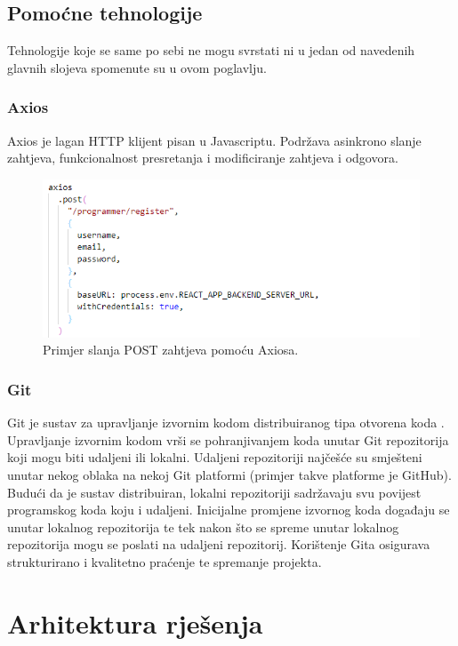 \documentclass[times, utf8, zavrsni]{fer}
\begin{document}
			\section{Pomoćne tehnologije}
			Tehnologije koje se same po sebi ne mogu svrstati ni u jedan od navedenih glavnih slojeva spomenute su u ovom poglavlju.
			\subsection{Axios}
			Axios je lagan HTTP klijent pisan u Javascriptu. Podržava asinkrono slanje zahtjeva, funkcionalnost presretanja i modificiranje zahtjeva i odgovora. 
			\begin{figure}[H]
				\centering
				\includegraphics[width=\linewidth]{pictures/prikazi/Axios.png}
				\caption{Primjer slanja POST zahtjeva pomoću Axiosa.}
				\label{fig:axios}
			\end{figure}
			\subsection{Git}
			Git je sustav za upravljanje izvornim kodom distribuiranog tipa otvorena koda . Upravljanje izvornim kodom vrši se pohranjivanjem koda unutar Git repozitorija koji mogu biti udaljeni ili lokalni. Udaljeni repozitoriji  najčešće su smješteni unutar nekog oblaka  na nekoj Git platformi (primjer takve platforme je GitHub). Budući da je sustav distribuiran, lokalni repozitoriji sadržavaju svu povijest programskog koda koju i udaljeni. Inicijalne promjene izvornog koda događaju se unutar lokalnog repozitorija te tek nakon što se spreme unutar lokalnog repozitorija mogu se poslati na udaljeni repozitorij. Korištenje Gita osigurava strukturirano i kvalitetno praćenje te spremanje projekta.
	
	\chapter{Arhitektura rješenja}
\end{document}
